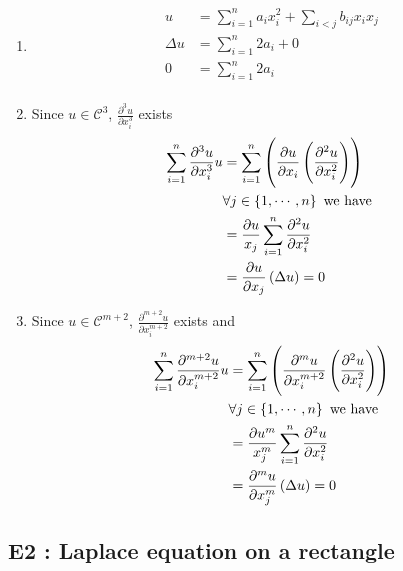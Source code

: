\begin{enumerate}
    \item 
        \begin{align*}
            u  &= \sum_{i=1}^{n} a_i x _{ i }^{ 2 } + \sum_{i<j}^{} b_{ij}x_ix_j \\
            \Delta u  &= \sum_{i=1}^{n} 2a_i + 0 \\
            0  &= \sum_{i=1}^{n} 2a_i  \\
        \end{align*}
    \item 
        Since $ u \in \mathscr{ C } ^3 $, $ \frac{ \partial ^3u }{ \partial x^3_i }  $
        exists 
        \begin{align*}
            \sum_{i=1}^{n} \frac{ \partial ^3u }{ \partial x_i^3 } u &= \sum_{i=1}^{n}
            \left( \frac{ \partial u }{ \partial x_i } \left( \frac{ \partial^2 u }{
            \partial x_i^2 } \right) \right)  \\ 
             & \forall j \in \set{ 1, \cdots, n }  \text{ we have }  \\ 
             &= \frac{ \partial u }{ x_j } \sum_{i=1}^{n} \frac{ \partial ^2 u  }{
             \partial x_i^2  } \\
             &= \frac{ \partial u }{ \partial x_j } \left( \Delta u\right) = 0 
        \end{align*}
    \item Since $ u \in \mathscr{ C } ^{m+2} $, $ \frac{ \partial ^{m+2}u }{ \partial
        x^{m+2}_i }  $
        exists and 
        \begin{align*}
            \sum_{i=1}^{n} \frac{ \partial ^{m+2}u }{ \partial x_i^{m+2} } u &= \sum_{i=1}^{n}
            \left( \frac{ \partial^{m} u }{ \partial x_i^{m+2} } \left( \frac{ \partial^2 u }{
            \partial x_i^2 } \right) \right)  \\ 
             & \forall j \in \set{ 1, \cdots, n }  \text{ we have }  \\ 
             &= \frac{ \partial u^{m} }{ x_j^{m} } \sum_{i=1}^{n} \frac{ \partial ^2 u  }{
             \partial x_i^2  } \\
             &= \frac{ \partial^m u }{ \partial x_j^m } \left( \Delta u\right) = 0 
        \end{align*} 
\end{enumerate}

\subsection{E2 : Laplace equation on a rectangle}
\label{subsec:E2 : Laplace equation on a rectangle}


